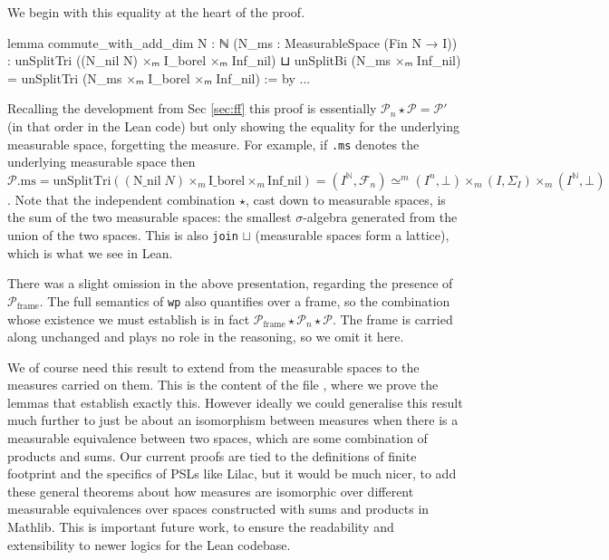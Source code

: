We begin with this equality at the heart of the proof.
\begin{leancode}
lemma commute_with_add_dim {N : ℕ} (N_ms : MeasurableSpace (Fin N → I))
    : unSplitTri ((N_nil N) ×ₘ I_borel ×ₘ Inf_nil) ⊔ unSplitBi (N_ms ×ₘ Inf_nil)
      = unSplitTri (N_ms ×ₘ I_borel ×ₘ Inf_nil) := by ...
\end{leancode}
Recalling the development from Sec \ref{sec:ff} this proof is essentially $\mathcal{P}_n \star \mathcal{P} = \mathcal{P'}$ (in that order in the Lean code) but only showing the
equality for the underlying measurable space, forgetting the measure. For example, if \texttt{.ms} denotes the underlying measurable space then
$\mathcal{P}.\mathrm{ms} = \mathrm{unSplitTri}((\mathrm{N\_nil}\; N) \times_m \mathrm{I\_borel} \times_m \mathrm{Inf\_nil}) = (I^\mathbb{N}, \mathcal{F}_n) \simeq^m (I^n, \bot) \times_m (I, \Sigma_I) \times_m (I^\mathbb{N}, \bot)$.
Note that the independent combination $\star$, cast down to measurable spaces, is the sum of the two measurable spaces: the smallest $\sigma$-algebra generated from the union
of the two spaces. This is also \texttt{join} $\sqcup$ (measurable spaces form a lattice), which is what we see in Lean.

There was a slight omission in the above presentation, regarding the presence of $\mathcal{P}_{\mathrm{frame}}$. The full semantics of \texttt{wp} also
quantifies over a frame, so the combination whose existence we must establish is in fact $\mathcal{P}_{\mathrm{frame}} \star \mathcal{P}_n \star \mathcal{P}$.
The frame is carried along unchanged and plays no role in the reasoning, so we omit it here.

We of course need this result to extend from the measurable spaces to the measures carried on them. This is the content of the file , where we
prove the lemmas that establish exactly this. However ideally we could generalise this result much further to just be about an isomorphism between
measures when there is a measurable equivalence between two spaces, which are some combination of products and sums. Our current proofs are tied
to the definitions of finite footprint and the specifics of PSLs like Lilac, but it would be much nicer, to add these general theorems about how measures are
isomorphic over different measurable equivalences over spaces constructed with sums and products in Mathlib. This is important future work, to ensure
the readability and extensibility to newer logics for the Lean codebase.


